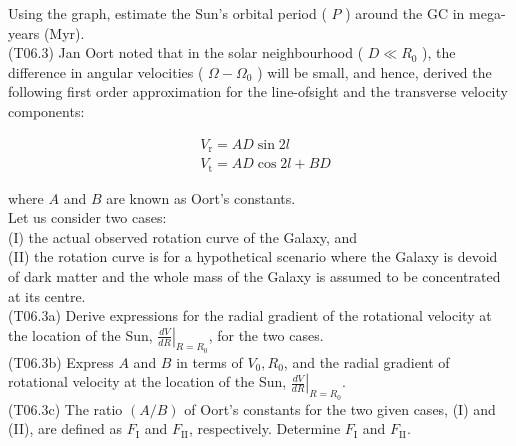 \documentclass[10pt]{article}
\begin{document}
    Using the graph, estimate the Sun's orbital period ( $P$ ) around the GC in mega-years (Myr).\\
    (T06.3) Jan Oort noted that in the solar neighbourhood ( $D \ll R_{0}$ ), the difference in angular velocities ( $\Omega-\Omega_{0}$ ) will be small, and hence, derived the following first order approximation for the line-ofsight and the transverse velocity components:
    
    $$
    \begin{aligned}
    & V_{\mathrm{r}}=A D \sin 2 l \\
    & V_{\mathrm{t}}=A D \cos 2 l+B D
    \end{aligned}
    $$
    
    where $A$ and $B$ are known as Oort's constants.\\
    Let us consider two cases:\\
    (I) the actual observed rotation curve of the Galaxy, and\\
    (II) the rotation curve is for a hypothetical scenario where the Galaxy is devoid of dark matter and the whole mass of the Galaxy is assumed to be concentrated at its centre.\\
    (T06.3a) Derive expressions for the radial gradient of the rotational velocity at the location of the Sun, $\left.\frac{d V}{d R}\right|_{R=R_{0}}$, for the two cases.\\
    (T06.3b) Express $A$ and $B$ in terms of $V_{0}, R_{0}$, and the radial gradient of rotational velocity at the location of the Sun, $\left.\frac{d V}{d R}\right|_{R=R_{0}}$.\\
    (T06.3c) The ratio $(A / B)$ of Oort's constants for the two given cases, (I) and (II), are defined as $F_{\mathrm{I}}$ and $F_{\mathrm{II}}$, respectively. Determine $F_{\mathrm{I}}$ and $F_{\mathrm{II}}$.
\end{document}
